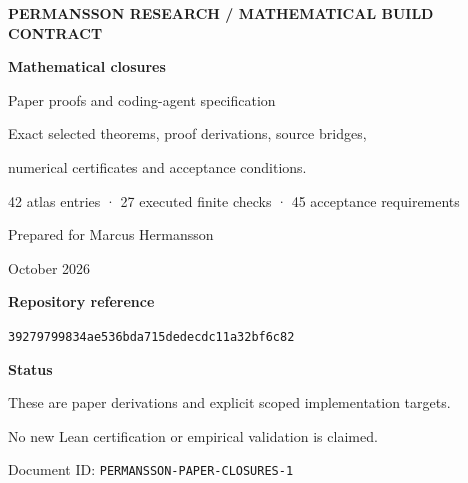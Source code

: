 \begin{titlepage}
\thispagestyle{empty}
\vspace*{1.3cm}
{\sffamily\small\bfseries\color{PermanssonGray}PERMANSSON RESEARCH / MATHEMATICAL BUILD CONTRACT}\par
\vspace{1.0cm}
{\sffamily\Huge\bfseries\color{PermanssonInk}Mathematical closures}\par
\vspace{0.35cm}
{\sffamily\LARGE\color{PermanssonInk}Paper proofs and coding-agent specification}\par
\vspace{1.0cm}
{\Large Exact selected theorems, proof derivations, source bridges,\par numerical certificates and acceptance conditions.}\par
\vspace{0.8cm}
{\large 42 atlas entries · 27 executed finite checks · 45 acceptance requirements}\par
\vfill
{\sffamily\large Prepared for Marcus Hermansson}\par
\vspace{0.4cm}
{ October 2026}\par
\vspace{0.6cm}
{\small\textbf{Repository reference}\par
\texttt{39279799834ae536bda715dedecdc11a32bf6c82}}\par
\vspace{0.6cm}
{\small\textbf{Status}\par
These are paper derivations and explicit scoped implementation targets.\par
No new Lean certification or empirical validation is claimed.}\par
\vspace{0.3cm}
{\footnotesize Document ID: \texttt{PERMANSSON-PAPER-CLOSURES-1}}\par
\end{titlepage}
\setcounter{page}{1}
